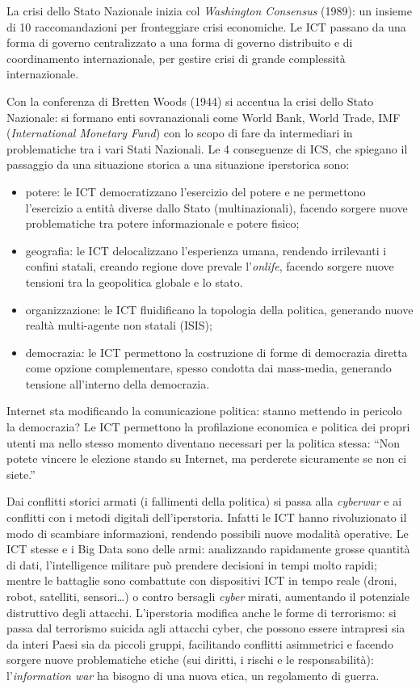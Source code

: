 \documentclass[a4page, 11pt]{article}
\begin{document}
La crisi dello Stato Nazionale inizia col \textit{Washington Consensus} (1989): un insieme di 10 raccomandazioni per fronteggiare crisi economiche.
Le ICT passano da una forma di governo centralizzato a una forma di governo distribuito e di coordinamento internazionale, per gestire crisi di grande complessità internazionale.

Con la conferenza di Bretten Woods (1944) si accentua la crisi dello Stato Nazionale: si formano enti sovranazionali come World Bank, World Trade, IMF (\textit{International Monetary Fund}) con lo scopo di fare da intermediari in problematiche tra i vari Stati Nazionali.
Le 4 conseguenze di ICS, che spiegano il passaggio da una situazione storica a una situazione iperstorica sono:
\begin{itemize}
  \item potere: le ICT democratizzano l'esercizio del potere e ne permettono l'esercizio a entità diverse dallo Stato (multinazionali), facendo sorgere nuove problematiche tra potere informazionale e potere fisico;
  \item geografia: le ICT delocalizzano l'esperienza umana, rendendo irrilevanti i confini statali, creando regione dove prevale l'\textit{onlife}, facendo sorgere nuove tensioni tra la geopolitica globale e lo stato.
  \item organizzazione: le ICT fluidificano la topologia della politica, generando nuove realtà multi-agente non statali (ISIS);
  \item democrazia: le ICT permettono la costruzione di forme di democrazia diretta come opzione complementare, spesso condotta dai mass-media, generando tensione all'interno della democrazia.
\end{itemize}

Internet sta modificando la comunicazione politica: stanno mettendo in pericolo la democrazia?
Le ICT permettono la profilazione economica e politica dei propri utenti ma nello stesso momento diventano necessari per la politica stessa: ``Non potete vincere le elezione stando su Internet, ma perderete sicuramente se non ci siete.''

Dai conflitti storici  armati (i fallimenti della politica) si passa alla \textit{cyberwar} e ai conflitti con i metodi digitali dell'iperstoria.
Infatti le ICT hanno rivoluzionato il modo di scambiare informazioni, rendendo possibili nuove modalità operative.
Le ICT stesse e i Big Data sono delle armi: analizzando rapidamente grosse quantità di dati, l'intelligence militare può prendere decisioni in tempi molto rapidi; mentre le battaglie sono combattute con dispositivi ICT in tempo reale (droni, robot, satelliti, sensori\ldots) o contro bersagli \textit{cyber} mirati, aumentando il potenziale distruttivo degli attacchi.
L'iperstoria modifica anche le forme di terrorismo: si passa dal terrorismo suicida agli attacchi cyber, che possono essere intrapresi sia da interi Paesi sia da piccoli gruppi, facilitando conflitti asimmetrici e facendo sorgere nuove problematiche etiche (sui diritti, i rischi e le responsabilità): l'\textit{information war} ha bisogno di una nuova etica, un regolamento di guerra. \newline
\end{document}
